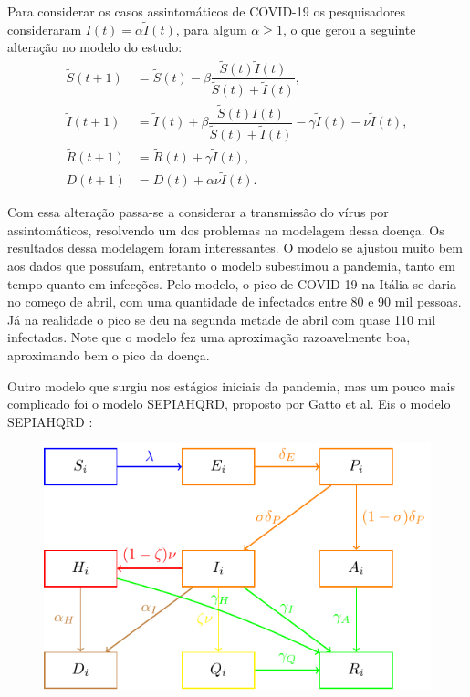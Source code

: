 \documentclass{article}
\begin{document}
Para considerar os casos assintomáticos de COVID-19 os pesquisadores consideraram $I(t) = \alpha\tilde{I}(t)$, para algum $\alpha \geq 1$, o que gerou a seguinte alteração no modelo do estudo:
\begin{equation*}
    \begin{split}
        \tilde{S}(t + 1) & = \tilde{S}(t) - \beta \dfrac{\tilde{S}(t) \tilde{I}(t)}{\tilde{S}(t) + \tilde{I}(t)}, \\
        \tilde{I}(t + 1) & = \tilde{I}(t) + \beta \dfrac{\tilde{S}(t) I(t)}{\tilde{S}(t) + \tilde{I}(t)} - \gamma \tilde{I}(t) - \nu \tilde{I}(t), \\
        \tilde{R}(t + 1) & = \tilde{R}(t) + \gamma \tilde{I}(t), \\
        D(t + 1) & = D(t) + \alpha \nu \tilde{I}(t).
    \end{split}
\end{equation*}

Com essa alteração passa-se a considerar a transmissão do vírus por assintomáticos, resolvendo um dos problemas na modelagem dessa doença. Os resultados dessa modelagem foram interessantes. O modelo se ajustou muito bem aos dados que possuíam, entretanto o modelo subestimou a pandemia, tanto em tempo quanto em infecções. Pelo modelo, o pico de COVID-19 na Itália se daria no começo de abril, com uma quantidade de infectados entre 80 e 90 mil pessoas. Já na realidade o pico se deu na segunda metade de abril com quase 110 mil infectados. Note que o modelo fez uma aproximação razoavelmente boa, aproximando bem o pico da doença.
% 

Outro modelo que surgiu nos estágios iniciais da pandemia, mas um pouco mais complicado foi o modelo SEPIAHQRD, proposto por Gatto et al. Eis o modelo SEPIAHQRD \cite{Gatto10484}:
\begin{figure}[H]
    \centering
    \includegraphics[page = 1]{Tikz - PDF/Tikz1.pdf}
\end{figure}
\end{document}
